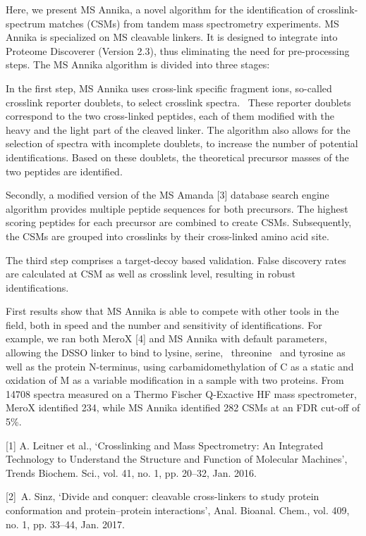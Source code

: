 {Here, we present MS Annika, a novel algorithm for the identification of crosslink-spectrum matches (CSMs) from tandem mass spectrometry experiments. MS Annika is specialized on MS cleavable linkers. It is designed to integrate into Proteome Discoverer (Version 2.3), thus eliminating the need for pre-processing steps. The MS Annika algorithm is divided into three stages:

In the first step, MS Annika uses cross-link specific fragment ions, so-called crosslink reporter doublets, to select crosslink spectra.  These reporter doublets correspond to the two cross-linked peptides, each of them modified with the heavy and the light part of the cleaved linker. The algorithm also allows for the selection of spectra with incomplete doublets, to increase the number of potential identifications. Based on these doublets, the theoretical precursor masses of the two peptides are identified.

Secondly, a modified version of the MS Amanda [3] database search engine algorithm provides multiple peptide sequences for both precursors. The highest scoring peptides for each precursor are combined to create CSMs. Subsequently, the CSMs are grouped into crosslinks by their cross-linked amino acid site.

The third step comprises a target-decoy based validation. False discovery rates are calculated at CSM as well as crosslink level, resulting in robust identifications.

First results show that MS Annika is able to compete with other tools in the field, both in speed and the number and sensitivity of identifications. For example, we ran both MeroX [4] and MS Annika with default parameters, allowing the DSSO linker to bind to lysine, serine,  threonine  and tyrosine as well as the protein N-terminus, using carbamidomethylation of C as a static and oxidation of M as a variable modification in a sample with two proteins. From 14708 spectra measured on a Thermo Fischer Q-Exactive HF mass spectrometer, MeroX identified 234, while MS Annika identified 282 CSMs at an FDR cut-off of 5\%.

[1] A. Leitner et al., ‘Crosslinking and Mass Spectrometry: An Integrated Technology to Understand the Structure and Function of Molecular Machines’, Trends Biochem. Sci., vol. 41, no. 1, pp. 20–32, Jan. 2016.

[2] A. Sinz, ‘Divide and conquer: cleavable cross-linkers to study protein conformation and protein–protein interactions’, Anal. Bioanal. Chem., vol. 409, no. 1, pp. 33–44, Jan. 2017.

}
